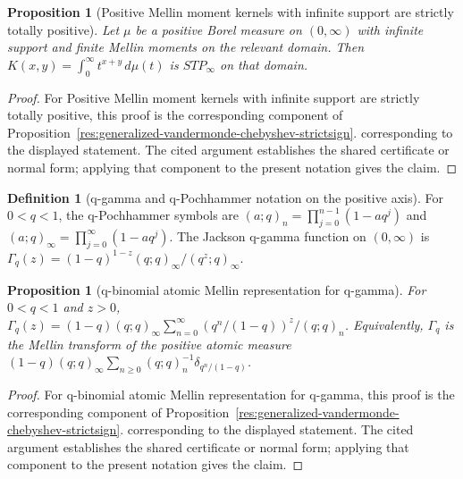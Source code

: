 \documentclass[11pt]{article}
\numberwithin{equation}{section}
\newtheorem{proposition}[theorem]{Proposition}
\theoremstyle{definition}
\newtheorem{definition}{Definition}[section]
\theoremstyle{remark}
\newcommand{\1}{\mathbf 1}
\begin{document}
\begin{proposition}[Positive Mellin moment kernels with infinite support are strictly totally positive]
\label{res:mellin-moment-kernel-stp-infinitesupport}
Let \(\mu\) be a positive Borel measure on \((0,\infty)\) with infinite support and finite Mellin moments on the relevant domain. Then \(K(x,y)=\int_0^\infty t^{x+y}\,d\mu(t)\) is \(STP_\infty\) on that domain.
\end{proposition}

\begin{proof}
For Positive Mellin moment kernels with infinite support are strictly totally positive, this proof is the corresponding component of Proposition~\ref{res:generalized-vandermonde-chebyshev-strictsign}.  corresponding to the displayed statement.  The cited argument establishes the shared certificate or normal form; applying that component to the present notation gives the claim.
\end{proof}

\begin{definition}[q-gamma and q-Pochhammer notation on the positive axis]
\label{res:qgamma-pochhammer-positiveaxis}
For \(0<q<1\), the q-Pochhammer symbols are \((a;q)_n=\prod_{j=0}^{n-1}(1-aq^j)\) and \((a;q)_\infty=\prod_{j=0}^{\infty}(1-aq^j)\). The Jackson q-gamma function on \((0,\infty)\) is \(\Gamma_q(z)=(1-q)^{1-z}(q;q)_\infty/(q^z;q)_\infty\).
\end{definition}

\begin{proposition}[q-binomial atomic Mellin representation for q-gamma]
\label{res:qbinomial-atomic-mellin-representation}
For \(0<q<1\) and \(z>0\), \(\Gamma_q(z)=(1-q)(q;q)_\infty\sum_{n=0}^{\infty}(q^n/(1-q))^z/(q;q)_n\). Equivalently, \(\Gamma_q\) is the Mellin transform of the positive atomic measure \((1-q)(q;q)_\infty\sum_{n\ge0}(q;q)_n^{-1}\delta_{q^n/(1-q)}\).
\end{proposition}

\begin{proof}
For q-binomial atomic Mellin representation for q-gamma, this proof is the corresponding component of Proposition~\ref{res:generalized-vandermonde-chebyshev-strictsign}.  corresponding to the displayed statement.  The cited argument establishes the shared certificate or normal form; applying that component to the present notation gives the claim.
\end{proof}
\end{document}
